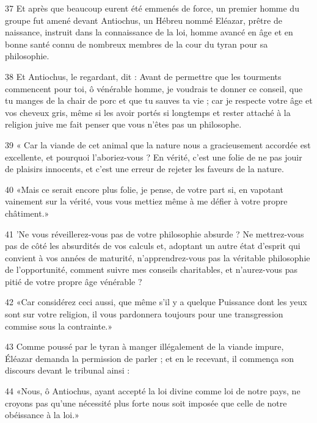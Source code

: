 \par 37 Et après que beaucoup eurent été emmenés de force, un premier homme du groupe fut amené devant Antiochus, un Hébreu nommé Eléazar, prêtre de naissance, instruit dans la connaissance de la loi, homme avancé en âge et en bonne santé connu de nombreux membres de la cour du tyran pour sa philosophie.

\par 38 Et Antiochus, le regardant, dit : Avant de permettre que les tourments commencent pour toi, ô vénérable homme, je voudrais te donner ce conseil, que tu manges de la chair de porc et que tu sauves ta vie ; car je respecte votre âge et vos cheveux gris, même si les avoir portés si longtemps et rester attaché à la religion juive me fait penser que vous n'êtes pas un philosophe.

\par 39 « Car la viande de cet animal que la nature nous a gracieusement accordée est excellente, et pourquoi l'aboriez-vous ? En vérité, c'est une folie de ne pas jouir de plaisirs innocents, et c'est une erreur de rejeter les faveurs de la nature.

\par 40 «Mais ce serait encore plus folie, je pense, de votre part si, en vapotant vainement sur la vérité, vous vous mettiez même à me défier à votre propre châtiment.»

\par 41 'Ne vous réveillerez-vous pas de votre philosophie absurde ? Ne mettrez-vous pas de côté les absurdités de vos calculs et, adoptant un autre état d'esprit qui convient à vos années de maturité, n'apprendrez-vous pas la véritable philosophie de l'opportunité, comment suivre mes conseils charitables, et n'aurez-vous pas pitié de votre propre âge vénérable ?

\par 42 «Car considérez ceci aussi, que même s'il y a quelque Puissance dont les yeux sont sur votre religion, il vous pardonnera toujours pour une transgression commise sous la contrainte.»

\par 43 Comme poussé par le tyran à manger illégalement de la viande impure, Éléazar demanda la permission de parler ; et en le recevant, il commença son discours devant le tribunal ainsi :

\par 44 «Nous, ô Antiochus, ayant accepté la loi divine comme loi de notre pays, ne croyons pas qu'une nécessité plus forte nous soit imposée que celle de notre obéissance à la loi.»

